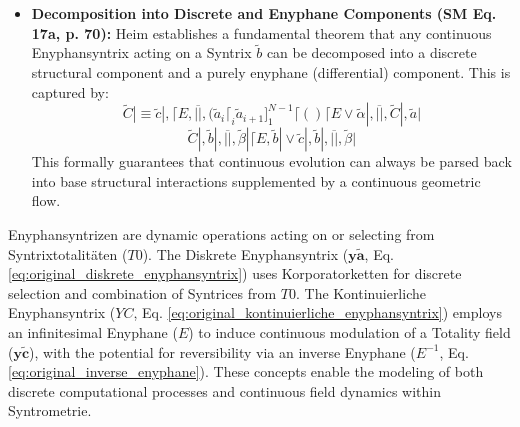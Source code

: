 \documentclass[12pt]{article}
\newcommand{\q}[1]{\enquote{#1}}
\newcommand{\syntrixtotalitaet}{T0}
\newcommand{\diskreteEnyphansyntrix}{\bm{y\widetilde{a}}}
\newcommand{\kontinuierlicheEnyphansyntrix}{YC}
\newcommand{\enyphane}{E}
\begin{document}
\begin{itemize}
\begin{itemize}
        \item The Kontinuierliche Enyphansyntrix \( \kontinuierlicheEnyphansyntrix \) thus represents a process of continuous modulation, evolution, or \q{flow} \textit{of} the Totality field \( \mathbf{y\widetilde{c}} \) itself. This concept is absolutely crucial for linking the abstract logical framework of Syntrometrie to physical field theories or to any system that is described by continuous dynamical laws. It provides a mechanism for describing how the entire potential state space of syntrometric structures can undergo smooth, continuous transformations over time or some other parameter.
    \end{itemize}

    \item \textbf{Decomposition into Discrete and Enyphane Components (SM Eq. 17a, p. 70):}
    Heim establishes a fundamental theorem that any continuous Enyphansyntrix acting on a Syntrix $\widetilde{b}$ can be decomposed into a discrete structural component and a purely enyphane (differential) component. This is captured by:
    \begin{equation}
\widetilde{C}| \equiv \widetilde{c}|, \lceil E, \overline{||}, ( \widetilde{a}_i \lceil_i \widetilde{a}_{i+1} ]_1^{N-1} \lceil ( ) \lceil E \vee \widetilde{\alpha}|, \overline{||}, \widetilde{C}|, \widetilde{a}|
\label{eq:original_kontinuierliche_enyphansyntrix}
\tag{17}
\end{equation}
\begin{equation}
\widetilde{C}|, \widetilde{b}|, \overline{||}, \widetilde{\beta}| \lceil E, \widetilde{b}| \vee \widetilde{c}|, \widetilde{b}|, \overline{||}, \widetilde{\beta}|
\label{eq:original_decomposition_17a}
\tag{17a}
\end{equation}
    This formally guarantees that continuous evolution can always be parsed back into base structural interactions supplemented by a continuous geometric flow.
\end{itemize}

Enyphansyntrizen are dynamic operations acting on or selecting from Syntrixtotalitäten (\(\syntrixtotalitaet\)). The Diskrete Enyphansyntrix (\(\diskreteEnyphansyntrix\), Eq. \eqref{eq:original_diskrete_enyphansyntrix}) uses Korporatorketten for discrete selection and combination of Syntrices from \( \syntrixtotalitaet \). The Kontinuierliche Enyphansyntrix (\(\kontinuierlicheEnyphansyntrix\), Eq. \eqref{eq:original_kontinuierliche_enyphansyntrix}) employs an infinitesimal Enyphane (\(\enyphane\)) to induce continuous modulation of a Totality field (\(\mathbf{y\widetilde{c}}\)), with the potential for reversibility via an inverse Enyphane (\(\enyphane^{-1}\), Eq. \eqref{eq:original_inverse_enyphane}). These concepts enable the modeling of both discrete computational processes and continuous field dynamics within Syntrometrie.
\end{document}
